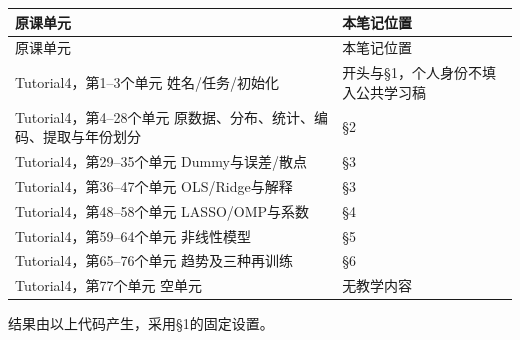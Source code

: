 \begingroup
\small\setlength{\tabcolsep}{3pt}
\renewcommand{\arraystretch}{1.22}
\begin{longtable}{@{}>{\raggedright\arraybackslash}p{}>{\raggedright\arraybackslash}p{}@{}}
\toprule
原课单元 & 本笔记位置 \\
\midrule\endfirsthead
原课单元 & 本笔记位置 \\
\midrule\endhead
\bottomrule\endfoot
Tutorial4，第1–3个单元 姓名/任务/初始化 & 开头与§1，个人身份不填入公共学习稿 \\
Tutorial4，第4–28个单元 原数据、分布、统计、编码、提取与年份划分 & §2 \\
Tutorial4，第29–35个单元 Dummy与误差/散点 & §3 \\
Tutorial4，第36–47个单元 OLS/Ridge与解释 & §3 \\
Tutorial4，第48–58个单元 LASSO/OMP与系数 & §4 \\
Tutorial4，第59–64个单元 非线性模型 & §5 \\
Tutorial4，第65–76个单元 趋势及三种再训练 & §6 \\
Tutorial4，第77个单元 空单元 & 无教学内容 \\
\end{longtable}
\endgroup


结果由以上代码产生，采用§1的固定设置。




